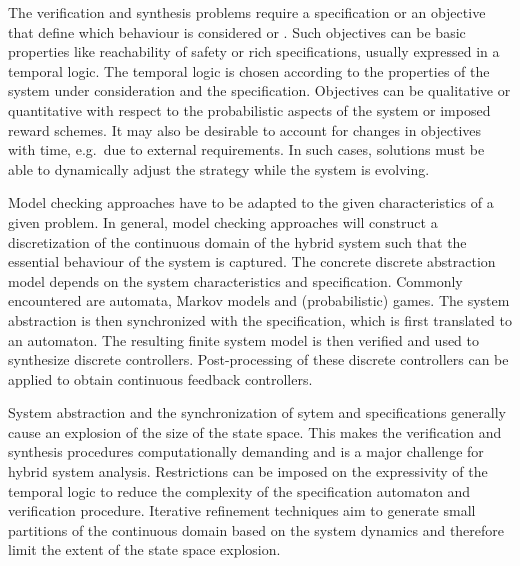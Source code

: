 The verification and synthesis problems require a specification or an objective that define which behaviour is considered  or .
Such objectives can be basic properties like reachability of safety or rich specifications, usually expressed in a temporal logic.
The temporal logic is chosen according to the properties of the system under consideration and the specification.
Objectives can be qualitative or quantitative with respect to the probabilistic aspects of the system or imposed reward schemes.
It may also be desirable to account for changes in objectives with time, e.g.\ due to external requirements.
In such cases, solutions must be able to dynamically adjust the strategy while the system is evolving.

Model checking approaches have to be adapted to the given characteristics of a given problem.
In general, model checking approaches will construct a discretization of the continuous domain of the hybrid system such that the essential behaviour of the system is captured.
The concrete discrete abstraction model depends on the system characteristics and specification.
Commonly encountered are automata, Markov models and (probabilistic) games.
The system abstraction is then synchronized with the specification, which is first translated to an automaton.
The resulting finite system model is then verified and used to synthesize discrete controllers.
Post-processing of these discrete controllers can be applied to obtain continuous feedback controllers.

System abstraction and the synchronization of sytem and specifications generally cause an explosion of the size of the state space.
This makes the verification and synthesis procedures computationally demanding and is a major challenge for hybrid system analysis.
Restrictions can be imposed on the expressivity of the temporal logic to reduce the complexity of the specification automaton and verification procedure.
Iterative refinement techniques aim to generate small partitions of the continuous domain based on the system dynamics and therefore limit the extent of the state space explosion.

